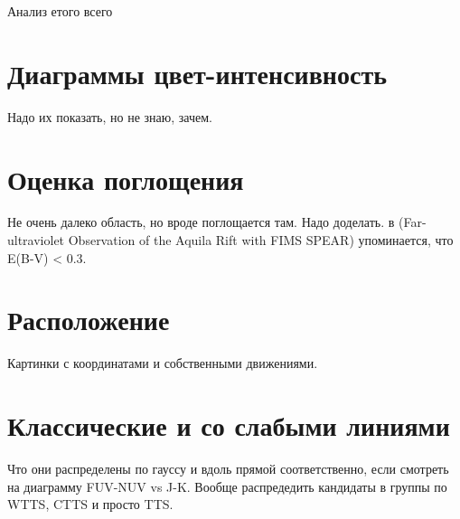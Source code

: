 Анализ етого всего

\section{Диаграммы цвет-интенсивность}
Надо их показать, но не знаю, зачем.

\section{Оценка поглощения}
Не очень далеко область, но вроде поглощается там. Надо доделать.
в (Far-ultraviolet Observation of the Aquila Rift with FIMS SPEAR) упоминается, что E(B-V) < 0.3.

\section{Расположение}
Картинки с координатами и собственными движениями.

\section{Классические и со слабыми линиями}
Что они распределены по гауссу и вдоль прямой соответственно, если смотреть на диаграмму FUV-NUV vs J-K. Вообще распредедить кандидаты в группы по WTTS, CTTS и просто TTS.
